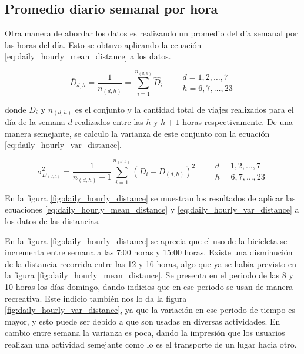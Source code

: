 \subsection{Promedio diario semanal por hora}

Otra manera de abordar los datos es realizando un promedio del día semanal por las horas del día. Esto se obtuvo aplicando la ecuación \ref{eq:daily_hourly_mean_distance} a los datos.

\begin{equation}
    \bar{D}_{d,h} = \frac{1}{n_{(d,h)}} = \sum_{i=1}^{n_{(d,h)}} \hat{D}_{i} \qquad \begin{matrix}
        d=1,2,\dots,7 \\ h=6,7,\dots,23
    \end{matrix} \label{eq:daily_hourly_mean_distance}
\end{equation}

donde $D_i$ y $n_{(d,h)}$ es el conjunto y la cantidad total de viajes realizados para el día de la semana $d$ realizados entre las $h$ y $h+1$ horas respectivamente. De una manera semejante, se calculo la varianza de este conjunto con la ecuación \ref{eq:daily_hourly_var_distance}.

\begin{equation}
    \sigma^2_{D_{(d,h)}} = \frac{1}{n_{(d,h)}-1} \sum_{i=1}^{n_{(d,h)}} (D_i-\bar{D}_{(d,h)})^2 \qquad \begin{matrix}
        d=1,2,\dots,7 \\ h=6,7,\dots,23
    \end{matrix} \label{eq:daily_hourly_var_distance}
\end{equation}

En la figura \ref{fig:daily_hourly_distance} se muestran los resultados de aplicar las ecuaciones \ref{eq:daily_hourly_mean_distance} y \ref{eq:daily_hourly_var_distance} a los datos de las distancias.

En la figura \ref{fig:daily_hourly_distance} se aprecia que el uso de la bicicleta se incrementa entre semana a las 7:00 horas y 15:00 horas. Existe una disminución de la distancia recorrida entre las 12 y 16 horas, algo que ya se habia previsto en la figura \ref{fig:daily_hourly_mean_distance}. Se presenta en el periodo de las 8 y 10 horas los días domingo, dando indicios que en ese periodo se usan de manera recreativa. Este indicio también nos lo da la figura \ref{fig:daily_hourly_var_distance}, ya que la variación en ese periodo de tiempo es mayor, y esto puede ser debido a que son usadas en diversas actividades. En cambio entre semana la varianza es poca, dando la impresión que los usuarios realizan una actividad semejante como lo es el transporte de un lugar hacia otro.


